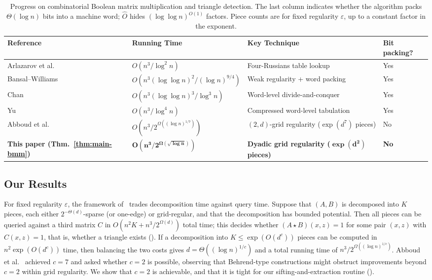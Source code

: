 \documentclass[11pt]{article}
\theoremstyle{definition}
\renewcommand{\label}[1]{}%
\begin{document}
\begin{table}[t]
\centering
\footnotesize
\setlength{\tabcolsep}{0pt}
\begin{tabular*}{\textwidth}{@{\extracolsep{\fill}}llll@{}}
\toprule
\textbf{Reference} & \textbf{Running Time} & \textbf{Key Technique} & \textbf{Bit packing?} \\
\midrule
Arlazarov et al.~\cite{ADKF70} & $O(n^3 / \log^2 n)$ & Four-Russians table lookup & Yes \\
Bansal--Williams~\cite{BansalW12} & $O(n^3 (\log\log n)^2 / (\log n)^{9/4})$ & Weak regularity + word packing & Yes \\
Chan~\cite{Chan15} & $O(n^3 (\log\log n)^3 / \log^3 n)$ & Word-level divide-and-conquer & Yes \\
Yu~\cite{Yu18} & $\hat{O}(n^3 / \log^4 n)$ & Compressed word-level tabulation & Yes \\
Abboud et al.~\cite{AFKLM24} & $O(n^3 / 2^{\Omega((\log n)^{1/7})})$ & $(2, d)$-grid regularity ($\exp(d^7)$ pieces) & No \\
\textbf{This paper (Thm.~\ref{thm:main-bmm})} & $\mathbf{O(n^3 / 2^{\Omega(\sqrt{\log n})})}$ & \textbf{Dyadic grid regularity ($\boldsymbol{\exp(d^2)}$ pieces)} & \textbf{No} \\
\bottomrule
\end{tabular*}
\caption{Progress on combinatorial Boolean matrix multiplication and triangle detection. The last column indicates whether the algorithm packs $\Theta(\log n)$ bits into a machine word; $\hat{O}$ hides $(\log\log n)^{O(1)}$ factors. Piece counts are for fixed regularity $\varepsilon$, up to a constant factor in the exponent.}
\label{tab:bmm-history}
\end{table}

\subsection{Our Results}
\label{sec:results}

For fixed regularity $\varepsilon$, the framework of~\cite{AFKLM24} trades decomposition time against query time. Suppose that $(A, B)$ is decomposed into $K$ pieces, each either $2^{-\Theta(d)}$-sparse (or one-edge) or grid-regular, and that the decomposition has bounded potential. Then all pieces can be queried against a third matrix $C$ in $O(n^2 K + n^3 / 2^{\Omega(d)})$ total time; this decides whether $(A \star B)(x, z) = 1$ for some pair $(x, z)$ with $C(x, z) = 1$, that is, whether a triangle exists (). If a decomposition into $K \le \exp(O(d^c))$ pieces can be computed in $n^2 \exp(O(d^c))$ time, then balancing the two costs gives $d = \Theta((\log n)^{1/c})$ and a total running time of $n^3 / 2^{\Omega((\log n)^{1/c})}$. Abboud et al.~\cite[Section~3.4]{AFKLM24} achieved $c = 7$ and asked whether $c = 2$ is possible, observing that Behrend-type constructions might obstruct improvements beyond $c = 2$ within grid regularity. We show that $c = 2$ is achievable, and that it is tight for our sifting-and-extraction routine ().
\end{document}
